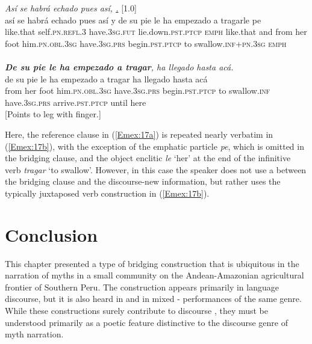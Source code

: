 \documentclass[output=paper]{LSP/langsci}
\begin{document}
\begin{exe}
\ex \label{Em17ab}
\begin{xlist}
\ex \label{Emex:17a}
\glt \textit{Así se habrá echado pues así,  \underline{.}} [1.0]\\
\gll así se habrá echado pues así y de su pie le ha empezado a tragarle pe \\
 like.that self\textsc{.pn.refl.3} have\textsc{.3sg.fut} lie.down\textsc{.pst.ptcp} \textsc{emph} like.that and from her foot him\textsc{.pn.obl.3sg} have\textsc{.3sg.prs} begin\textsc{.pst.ptcp} to swallow\textsc{.inf+pn.3sg} \textsc{emph}\\
\glt {}\\
\ex \label{Emex:17b}
\glt \textit{\textbf{De su pie le ha empezado a tragar}, ha llegado hasta acá.}\\
\gll de su pie le ha empezado a tragar ha llegado hasta acá\\     	      
    from her foot him\textsc{.pn.obl.3sg} have\textsc{.3sg.prs} begin\textsc{.pst.ptcp} to swallow\textsc{.inf} have\textsc{.3sg.prs} arrive\textsc{.pst.ptcp} until here\\
\glt {} [Points to leg with finger.] 
\end{xlist}
\end{exe}


Here, the reference clause in (\ref{Emex:17a}) is repeated nearly verbatim in (\ref{Emex:17b}), with the exception of the emphatic particle \textit{pe}, which is omitted in the bridging clause, and the object enclitic \textit{le} `her' at the end of the infinitive verb \textit{tragar} `to swallow'. However, in this case the speaker does not use a  between the bridging clause and the discourse-new information, but rather uses the typically  juxtaposed verb construction in (\ref{Emex:17b}).
%

\section{Conclusion}
\label{Emconclus}
This chapter presented a type of bridging construction that is ubiquitous in the narration of  myths in a small community on the Andean-Amazonian agricultural frontier of Southern Peru. The construction appears primarily in  language discourse, but it is also heard in  and in mixed - performances of the same genre. While these constructions surely contribute to discourse , they must be understood primarily as a poetic feature distinctive to the discourse genre of myth narration.
\end{document}
